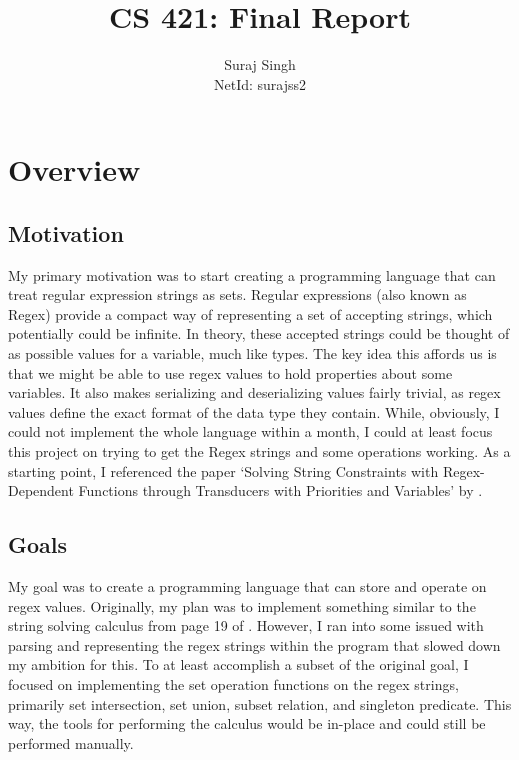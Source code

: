 \documentclass[letterpaper, 11pt]{article}
\title{CS 421: Final Report}
\author{Suraj Singh \\ NetId: surajss2 }
\begin{document}
\maketitle


\section{Overview}\label{sec:overview}
\subsection{Motivation}\label{sec:motivation}
My primary motivation was to start creating a programming language that can treat regular expression strings as sets.
Regular expressions (also known as Regex) provide a compact way of representing a set of accepting strings, which potentially could be infinite.
In theory, these accepted strings could be thought of as possible values for a variable, much like types.
The key idea this affords us is that we might be able to use regex values to hold properties about some variables.
It also makes serializing and deserializing values fairly trivial, as regex values define the exact format of the data type they contain.
While, obviously, I could not implement the whole language within a month, I could at least focus this project on trying to get the Regex strings and some operations working.
As a starting point, I referenced the paper `Solving String Constraints with Regex-Dependent Functions through Transducers with Priorities and Variables' by .

\subsection{Goals}\label{sec:goals}
My goal was to create a programming language that can store and operate on regex values.
Originally, my plan was to implement something similar to the string solving calculus from page 19 of .
However, I ran into some issued with parsing and representing the regex strings within the program that slowed down my ambition for this.
To at least accomplish a subset of the original goal, I focused on implementing the set operation functions on the regex strings, primarily set intersection, set union, subset relation, and singleton predicate.
This way, the tools for performing the calculus would be in-place and could still be performed manually. 
\end{document}
